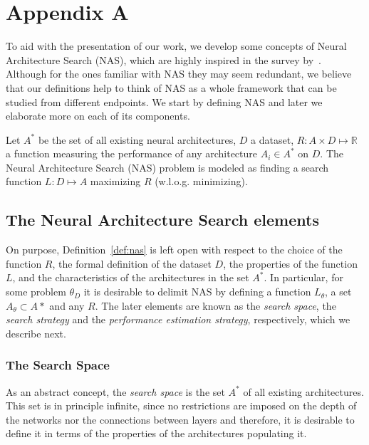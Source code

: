 \section*{Appendix A}\label{app:preliminaries}

To aid with the presentation of our work, we develop some concepts of Neural Architecture Search (NAS), which are highly inspired in the survey by~\cite{NASsurvey}. Although for the ones familiar with NAS they may seem redundant, we believe that our definitions help to think of NAS as a whole framework that can be studied from different endpoints. We start by defining NAS and later we elaborate more on each of its components.

\begin{definition}
\label{def:nas}
Let $A^*$ be the set of all existing neural architectures, $D$ a dataset, $R: A \times D \mapsto \mathbb{R}$ a function measuring the performance of any architecture $A_i \in A^*$ on $D$. The Neural Architecture Search (NAS) problem is modeled as finding a search function $L: D \mapsto A$ maximizing $R$ (w.l.o.g. minimizing).
\end{definition}

\subsection*{The Neural Architecture Search elements}

On purpose, Definition~\ref{def:nas} is left open with respect to the choice of the function $R$, the formal definition of the dataset $D$, the properties of the function $L$, and the characteristics of the architectures in the set $A^*$. In particular, for some problem $\theta_D$ it is desirable to delimit NAS by defining a function $L_\theta$, a set $A_\theta \subset A*$ and any $R$. The later elements are known as the \textit{search space}, the \textit{search strategy} and the \textit{performance estimation strategy}, respectively, which we describe next.

\subsubsection*{The Search Space}

As an abstract concept, the \textit{search space} is the set $A^*$ of all existing architectures. This set is in principle infinite, since no restrictions are imposed on the depth of the networks nor the connections between layers and therefore, it is desirable to define it in terms of the properties of the architectures populating it.

